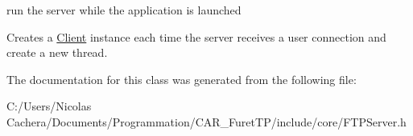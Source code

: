 run the server while the application is launched 

Creates a \hyperlink{classFTP_1_1Client}{Client} instance each time the server receives a user connection and create a new thread. 

The documentation for this class was generated from the following file\+:\begin{DoxyCompactItemize}
\item 
C\+:/\+Users/\+Nicolas Cachera/\+Documents/\+Programmation/\+C\+A\+R\+\_\+\+Furet\+T\+P/include/core/F\+T\+P\+Server.\+h\end{DoxyCompactItemize}
